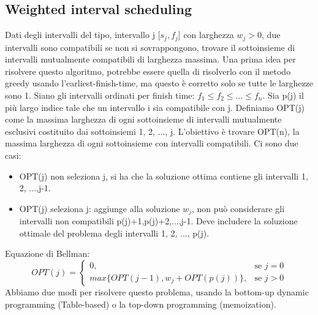 \documentclass{article}
\begin{document}
\subsection{Weighted interval scheduling}
Dati degli intervalli del tipo, intervallo j [$s_j,f_j$] con larghezza $w_j>0$, due intervalli sono compatibili se non si sovrappongono, trovare il sottoinsieme di intervalli mutualmente compatibili di larghezza massima.
Una prima idea per risolvere questo algoritmo, potrebbe essere quella di risolverlo con il metodo greedy usando l'earliest-finish-time, ma questo è corretto solo se tutte le larghezze sono 1.
Siano gli intervalli ordinati per finish time: $f_1 \leq f_2 \leq \dots \leq f_n$.
Sia p(j) il più largo indice tale che un intervallo i sia compatibile con j.
Definiamo OPT(j) come la massima larghezza di ogni sottoinsieme di intervalli mutualmente esclusivi costituito dai sottoinsiemi 1, 2, ..., j.
L'obiettivo è trovare OPT(n), la massima larghezza di ogni sottoinsieme con intervalli compatibili.
Ci sono due casi:
\begin{itemize}
    \item OPT(j) non seleziona j, si ha che la soluzione ottima contiene gli intervalli 1, 2, ...,j-1.
    \item OPT(j) seleziona j: aggiunge alla soluzione $w_j$, non può considerare gli intervalli non compatibili {p(j)+1,p(j)+2,...,j-1}. Deve includere la soluzione ottimale del problema degli intervalli 1, 2, ..., p(j).   
\end{itemize}
Equazione di Bellman: 
\[
OPT(j) =\begin{cases} 0, & \mbox{se }j=0 \\ max\{OPT(j-1), w_j+OPT(p(j))\}, & \mbox{se }j>0
\end{cases}
\]
Abbiamo due modi per risolvere questo problema, usando la bottom-up dynamic programming (Table-based) o la top-down programming (memoization).
\end{document}
